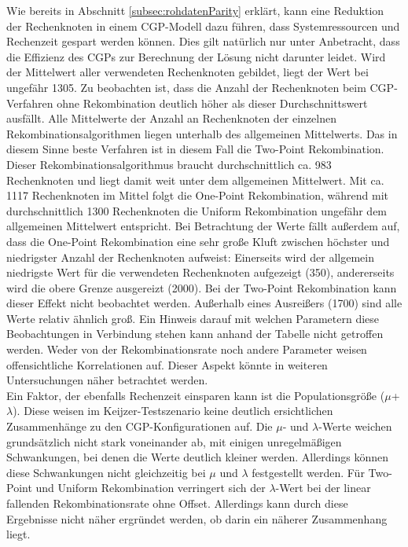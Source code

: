 Wie bereits in Abschnitt \ref{subsec:rohdatenParity} erklärt, kann eine Reduktion der Rechenknoten in einem CGP-Modell dazu führen, dass Systemressourcen und Rechenzeit gespart werden können.
Dies gilt natürlich nur unter Anbetracht, dass die Effizienz des CGPs zur Berechnung der Lösung nicht darunter leidet.
Wird der Mittelwert aller verwendeten Rechenknoten gebildet, liegt der Wert bei ungefähr 1305. 
Zu beobachten ist, dass die Anzahl der Rechenknoten beim CGP-Verfahren ohne Rekombination deutlich höher als dieser Durchschnittswert ausfällt.
Alle Mittelwerte der Anzahl an Rechenknoten der einzelnen Rekombinationsalgorithmen liegen unterhalb des allgemeinen Mittelwerts.
Das in diesem Sinne beste Verfahren ist in diesem Fall die Two-Point Rekombination.
Dieser Rekombinationsalgorithmus braucht durchschnittlich ca. 983 Rechenknoten und liegt damit weit unter dem allgemeinen Mittelwert.
Mit ca. 1117 Rechenknoten im Mittel folgt die One-Point Rekombination, während mit durchschnittlich 1300 Rechenknoten die Uniform Rekombination ungefähr dem allgemeinen Mittelwert entspricht.
Bei Betrachtung der Werte fällt außerdem auf, dass die One-Point Rekombination eine sehr große Kluft zwischen höchster und niedrigster Anzahl der Rechenknoten aufweist:
Einerseits wird der allgemein niedrigste Wert für die verwendeten Rechenknoten aufgezeigt (350), andererseits wird die obere Grenze ausgereizt (2000).
Bei der Two-Point Rekombination kann dieser Effekt nicht beobachtet werden.
Außerhalb eines Ausreißers (1700) sind alle Werte relativ ähnlich groß.
Ein Hinweis darauf mit welchen Parametern diese Beobachtungen in Verbindung stehen kann anhand der Tabelle nicht getroffen werden.
Weder von der Rekombinationsrate noch andere Parameter weisen offensichtliche Korrelationen auf.
Dieser Aspekt könnte in weiteren Untersuchungen näher betrachtet werden.\\
Ein Faktor, der ebenfalls Rechenzeit einsparen kann ist die Populationsgröße ($\mu$+$\lambda$).
Diese weisen im Keijzer-Testszenario keine deutlich ersichtlichen Zusammenhänge zu den CGP-Konfigurationen auf.
Die $\mu$- und $\lambda$-Werte weichen grundsätzlich nicht stark voneinander ab, mit einigen unregelmäßigen Schwankungen, bei denen die Werte deutlich kleiner werden.
Allerdings können diese Schwankungen nicht gleichzeitig bei $\mu$ und $\lambda$ festgestellt werden.
Für Two-Point und Uniform Rekombination verringert sich der $\lambda$-Wert bei der linear fallenden Rekombinationsrate ohne Offset.
Allerdings kann durch diese Ergebnisse nicht näher ergründet werden, ob darin ein näherer Zusammenhang liegt.\\

